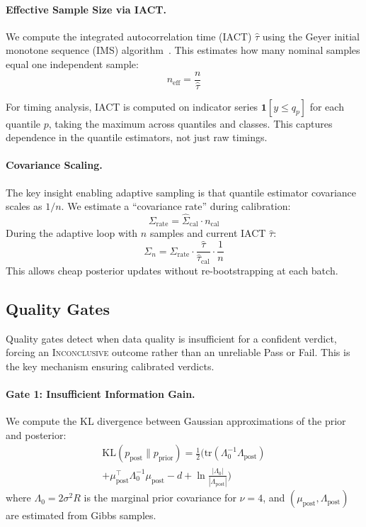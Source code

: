 \paragraph{Effective Sample Size via IACT.}
We compute the integrated autocorrelation time (IACT) $\hat{\tau}$ using the Geyer initial monotone sequence (IMS) algorithm~\cite{geyer1992}. This estimates how many nominal samples equal one independent sample:
\begin{equation}
n_{\text{eff}} = \frac{n}{\hat{\tau}}
\end{equation}

For timing analysis, IACT is computed on indicator series $\mathbf{1}[y \leq q_p]$ for each quantile $p$, taking the maximum across quantiles and classes. This captures dependence in the quantile estimators, not just raw timings.

\paragraph{Covariance Scaling.}
The key insight enabling adaptive sampling is that quantile estimator covariance scales as $1/n$. We estimate a ``covariance rate'' during calibration:
\begin{equation}
\Sigma_{\text{rate}} = \hat{\Sigma}_{\text{cal}} \cdot n_{\text{cal}}
\end{equation}
During the adaptive loop with $n$ samples and current IACT $\hat{\tau}$:
\begin{equation}
\Sigma_n = \Sigma_{\text{rate}} \cdot \frac{\hat{\tau}}{\hat{\tau}_{\text{cal}}} \cdot \frac{1}{n}
\end{equation}
This allows cheap posterior updates without re-bootstrapping at each batch.

\subsection{Quality Gates}
\label{app:gates}

Quality gates detect when data quality is insufficient for a confident verdict, forcing an \textsc{Inconclusive} outcome rather than an unreliable Pass or Fail. This is the key mechanism ensuring calibrated verdicts.

\paragraph{Gate 1: Insufficient Information Gain.}
We compute the KL divergence between Gaussian approximations of the prior and posterior:
\begin{multline}
\text{KL}(p_{\text{post}} \| p_{\text{prior}}) = \frac{1}{2}\Big(
\text{tr}(\Lambda_0^{-1}\Lambda_{\text{post}}) \\
+ \mu_{\text{post}}^\top \Lambda_0^{-1} \mu_{\text{post}}
- d + \ln\frac{|\Lambda_0|}{|\Lambda_{\text{post}}|}
\Big)
\end{multline}
where $\Lambda_0 = 2\sigma^2 R$ is the marginal prior covariance for $\nu=4$, and $(\mu_{\text{post}}, \Lambda_{\text{post}})$ are estimated from Gibbs samples.

